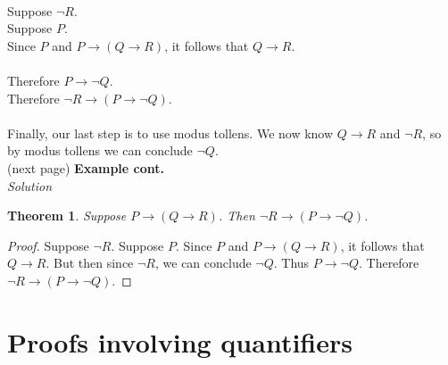\documentclass{report}
\newtheorem*{theorem}{Theorem}
\theoremstyle{definition}
\begin{document}
\vspace{1mm}\\
\indent Suppose $\neg R$.\\
\indent\indent Suppose $P$.\\
\indent\indent\indent Since $P$ and $P\to(Q\to R)$, it follows that $Q\to R$.\\
\indent\indent{}\\
\indent\indent Therefore $P\to\neg Q$.\\
\indent Therefore $\neg R\to(P\to\neg Q)$.\\
\vspace{1mm}\\
Finally, our last step is to use modus tollens. We now know $Q\to R$ and $\neg R$, so by modus tollens we can conclude $\neg Q$.\\
(next page)\newpage
\noindent\textbf{Example cont.}\\
\textit{Solution}
\begin{theorem}
Suppose $P\to(Q\to R)$. Then $\neg R\to(P\to\neg Q)$.
\end{theorem}
\begin{proof}
Suppose $\neg R$. Suppose $P$. Since $P$ and $P\to(Q\to R)$, it follows that $Q\to R$. But then since $\neg R$, we can conclude $\neg Q$. Thus
$P\to\neg Q$. Therefore $\neg R\to(P\to\neg Q)$.
\end{proof}
\newpage

\section{Proofs involving quantifiers}
\end{document}
